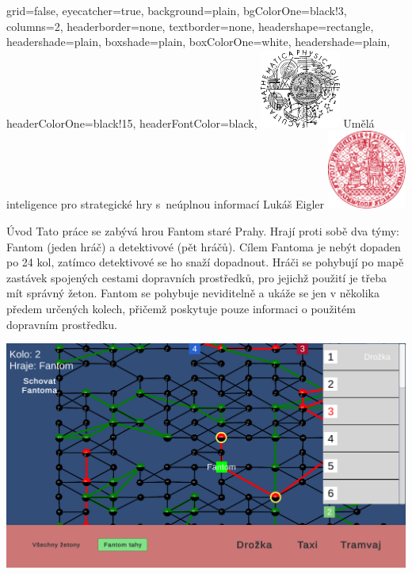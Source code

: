 \documentclass[portrait,a0paper,fontscale=0.25]{baposter}
\begin{document}
\color{black!80} %
\begin{poster}{grid=false,
	eyecatcher=true,
	background=plain,
	bgColorOne=black!3, %
	columns=2,
	headerborder=none,
	textborder=none,
	headershape=rectangle,
	headershade=plain,
	boxshade=plain,
	boxColorOne=white,
	headershade=plain,
	headerColorOne=black!15, %
	headerFontColor=black,
	}%
	{\includegraphics[height=7em]{logos/mff-black.pdf}}
	{Umělá inteligence pro strategické hry s~neúplnou informací}
	{\vspace{1ex} Lukáš Eigler}
	{\includegraphics[height=7em]{logos/uk-red.pdf}}


%
%

\begin{posterbox}[column=0,name=background]{Úvod}
Tato práce se zabývá hrou Fantom staré Prahy. Hrají proti sobě dva týmy: Fantom (jeden hráč) a detektivové (pět hráčů). Cílem Fantoma je nebýt dopaden po 24 kol, zatímco detektivové se ho snaží dopadnout. Hráči se pohybují po mapě zastávek spojených cestami dopravních prostředků, pro jejichž použití je třeba mít správný žeton. Fantom se pohybuje neviditelně a ukáže se jen v několika předem určených kolech, přičemž poskytuje pouze informaci o použitém dopravním prostředku.

\begin{center}
\includegraphics[width=0.8\linewidth]{img/ingame_view.png}
\end{center}


\end{posterbox}
\end{poster}
\end{document}
